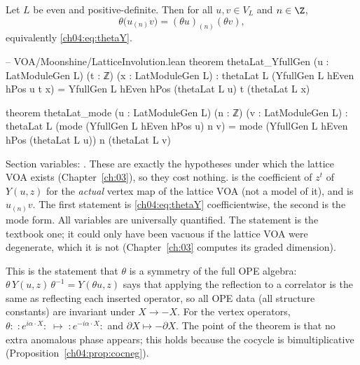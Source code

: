 \begin{theorem}\label{ch04:thm:thetamode}
Let $L$ be even and positive-definite. Then for all $u,v\in V_L$ and $n\in\Z$,
\begin{equation*}
  \theta\big(u_{(n)}v\big)=(\theta u)_{(n)}(\theta v),
\end{equation*}
equivalently \eqref{ch04:eq:thetaY}.
\end{theorem}

\begin{leancode}
-- VOA/Moonshine/LatticeInvolution.lean
theorem thetaLat_YfullGen (u : LatModuleGen L) (t : ℤ) (x : LatModuleGen L) :
    thetaLat L (YfullGen L hEven hPos u t x)
      = YfullGen L hEven hPos (thetaLat L u) t (thetaLat L x)

theorem thetaLat_mode (u : LatModuleGen L) (n : ℤ) (v : LatModuleGen L) :
    thetaLat L (mode (YfullGen L hEven hPos u) n v)
      = mode (YfullGen L hEven hPos (thetaLat L u)) n (thetaLat L v)
\end{leancode}

\begin{dictionary}
Section variables: . These are
exactly the hypotheses under which the lattice VOA exists (Chapter~\ref{ch:03}), so they cost
nothing.  is the coefficient of $z^t$ of $Y(u,z)$ for the
\emph{actual} vertex map of the lattice VOA  (not a model of it),
and  is $u_{(n)}v$. The first statement is \eqref{ch04:eq:thetaY}
coefficientwise, the second is the mode form. All variables are universally quantified. The
statement is the textbook one; it could only have been vacuous if the lattice VOA were degenerate,
which it is not (Chapter~\ref{ch:03} computes its graded dimension).
\end{dictionary}

\begin{physics}
This is the statement that $\theta$ is a symmetry of the full OPE algebra: $\theta\,Y(u,z)\,\theta^{-1}=Y(\theta u,z)$ says that applying the reflection to a correlator is the same as reflecting each inserted operator, so all OPE data (all structure constants) are invariant under $X\to-X$. For the vertex operators, $\theta:\;:\!e^{i\alpha\cdot X}\!:\;\mapsto\;:\!e^{-i\alpha\cdot X}\!:$ and $\partial X\mapsto-\partial X$. The point of the theorem is that no extra anomalous phase appears; this holds because the cocycle is bimultiplicative (Proposition~\ref{ch04:prop:cocneg}).
\end{physics}

